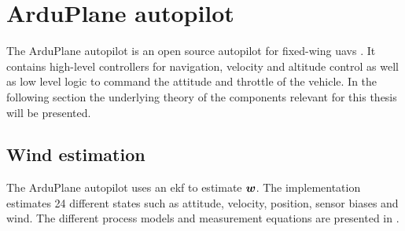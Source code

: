 \section{ArduPlane autopilot}
The ArduPlane autopilot is an open source autopilot for fixed-wing \acp{uav} \cite{arduplane}. 
It contains high-level controllers for navigation, velocity and altitude control as well as 
low level logic to command the attitude and throttle of the vehicle. In the following section
the underlying theory of the components relevant for this thesis will be presented.

\subsection{Wind estimation}
The ArduPlane autopilot uses an \ac{ekf} to estimate $\boldsymbol{w}$. The implementation estimates 24 different states such as attitude, velocity, position, sensor biases and wind. The different process models and 
measurement equations are presented in \cite{px4_ecl_ekf}.

